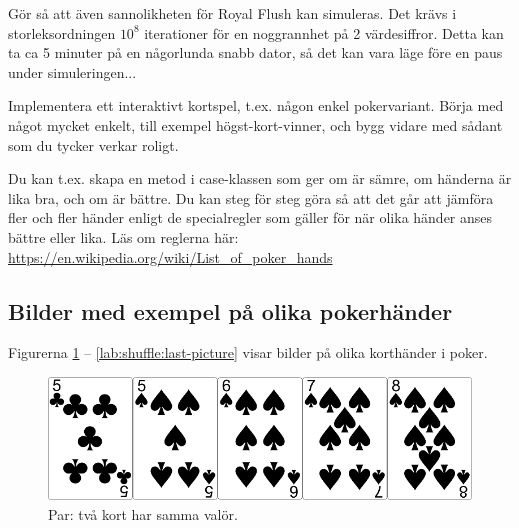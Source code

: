 \Task Gör så att även sannolikheten för Royal Flush kan simuleras. Det krävs i storleksordningen $10^8$ iterationer för en noggrannhet på 2 värdesiffror. Detta kan ta ca 5 minuter på en någorlunda snabb dator, så det kan vara läge före en paus under simuleringen...

\Task Implementera ett interaktivt kortspel, t.ex. någon enkel pokervariant. Börja med något mycket enkelt, till exempel högst-kort-vinner, och bygg vidare med sådant som du tycker verkar roligt.

Du kan t.ex. skapa en metod  i case-klassen  som ger  om  är sämre,  om händerna är lika bra, och  om  är bättre. Du kan steg för steg göra så att det går att jämföra fler och fler händer enligt de specialregler som gäller för när olika händer anses bättre eller lika. Läs om reglerna här: \url{https://en.wikipedia.org/wiki/List_of_poker_hands}



\subsection{Bilder med exempel på olika pokerhänder}\label{shuffle:hands}

Figurerna \ref{lab:shuffle:first-picture} -- \ref{lab:shuffle:last-picture} visar bilder på olika korthänder i poker.

\newcommand{\CardWidth}{0.5\textwidth}
\newcommand{\CardCaptionWidth}{0.3\textwidth}

\begin{figure}[H]
 \begin{minipage}[c]{\CardWidth}
  \includegraphics[width=\textwidth]{../img/w05-hands/pair.png}
 \end{minipage}
 \begin{minipage}[c]{\CardCaptionWidth}
  \caption{Par: två kort har samma valör.}
   \label{lab:shuffle:first-picture}
 \end{minipage}
\end{figure}

